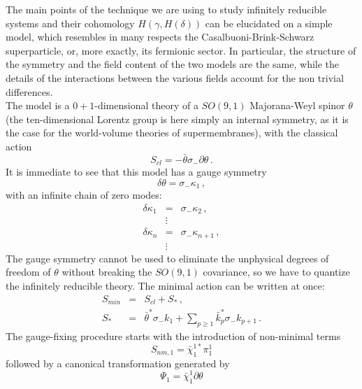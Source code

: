 \documentclass[a4paper,12pt]{article}
\begin{document}
The main points of the technique we are using to study infinitely
reducible systems and their cohomology $H(\gamma,H(\delta))$ can be
elucidated on a simple model, which resembles in many respects the
Casalbuoni-Brink-Schwarz
\cite{Brink-Schwarz,Siegel:1983hh,Lindstrom_BS,GH_BS,superparticle}
superparticle, or, more exactly, its fermionic sector. In particular,
the structure of the symmetry and the field content of the two models
are the same, while the details of the interactions between
the various fields account for the non trivial differences. \\
The model is a $0+1$-dimensional theory of a $SO(9,1)$ Majorana-Weyl
spinor $\theta$ (the ten-dimensional Lorentz group is here simply an
internal symmetry, as it is the case for the world-volume theories of
supermembranes), with the classical action
\begin{equation}
  \label{eq:chiral_spinor}
  S_{cl} = - \bar\theta \sigma_- \partial \theta \, .
\end{equation}
It is immediate to see that this model has a gauge symmetry
\begin{displaymath}
  \delta \theta = \sigma_- \kappa_1 \, ,
\end{displaymath}
with an infinite chain of zero modes:
\begin{eqnarray*}
  \delta \kappa_1 & = & \sigma_- \kappa_2 \, , \\
  & \vdots & \\
  \delta \kappa_n & = & \sigma_- \kappa_{n+1} \, , \\
 & \vdots &
\end{eqnarray*}
The gauge symmetry cannot be used to eliminate the unphysical degrees
of freedom of $\theta$ without breaking the $SO(9,1)$ covariance, so
we have to quantize the infinitely reducible theory. The minimal
action can be written at once:
\begin{eqnarray*}
  S_{min} & = & S_{cl} + S_* \, , \\ 
  S_* & = & \bar\theta^* \sigma_- k_1 + \sum_{p \geq 1} \bar
  k_p^* \sigma_- k_{p+1} \, .
\end{eqnarray*}
The gauge-fixing procedure starts with the introduction of non-minimal 
terms 
\begin{displaymath}
  S_{nm,1} = \bar\chi_1^{1*} \pi_1^1
\end{displaymath}
followed by a canonical transformation generated by 
\begin{displaymath}
  \Psi_1 = \bar\chi_1^1 \partial \theta
\end{displaymath}
\end{document}
